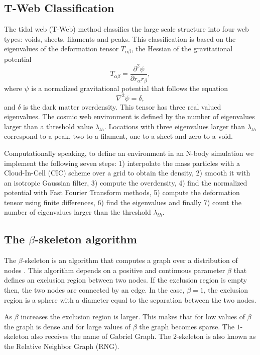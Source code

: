 \documentclass[usenatbib]{mnras}
\begin{document}
\subsection{T-Web Classification}

The tidal web (T-Web) method \citep{Hahn2007,Forero-Romero2009} classifies the large scale
structure into four web types: voids, sheets, filaments and peaks. 
This classification is based on the eigenvalues of the deformation tensor $T_{\alpha\beta}$, the Hessian of the gravitational potential
\begin{equation}
T_{\alpha\beta}=\frac{\partial^2\psi}{\partial r_{\alpha}r_{\beta}},
\end{equation}
%
where $\psi$ is a normalized gravitational potential that follows the equation
\begin{equation}
    \nabla^2 \psi = \delta,
\end{equation}
%
and $\delta$ is the dark matter overdensity.
This tensor has three real valued eigenvalues. 
The cosmic web environment is defined by the number of eigenvalues larger than
a threshold value $\lambda_{th}$.
Locations with three eigenvalues larger than $\lambda_{th}$ correspond to a peak, two to a filament, one to a sheet and zero to a void.

Computationally speaking, to define an environment in an N-body simulation 
we implement the following seven steps: 1) interpolate the mass particles with a Cloud-In-Cell
(CIC) scheme over a grid to obtain the density, 2) smooth it with an isotropic Gaussian filter,
3) compute the overdensity, 4) find the normalized potential with Fast Fourier Transform
methods, 5) compute the deformation tensor using finite differences, 6) find the eigenvalues and
finally 7) count the number of eigenvalues larger than the threshold $\lambda_{th}$.

\subsection{The $\beta$-skeleton algorithm}
The $\beta$-skeleton is an algorithm that computes a graph over a distribution of nodes
\citep{Kirkpatrick1985, Fang2019}. 
This algorithm depends on a positive and continuous parameter $\beta$ that defines an exclusion
region between two nodes.
If the exclusion region is empty then, the two nodes are connected by an edge. 
In the case, $\beta=1$, the exclusion region is a sphere with a diameter equal to the separation
between the two nodes. 

As $\beta$ increases the exclusion region is larger.
This makes that for low values of $\beta$ the graph is dense and for large values of $\beta$
the graph becomes sparse.
The $1$-skeleton also receives the name of Gabriel Graph. 
The $2$-skeleton is also known as the Relative Neighbor Graph (RNG).
\end{document}
